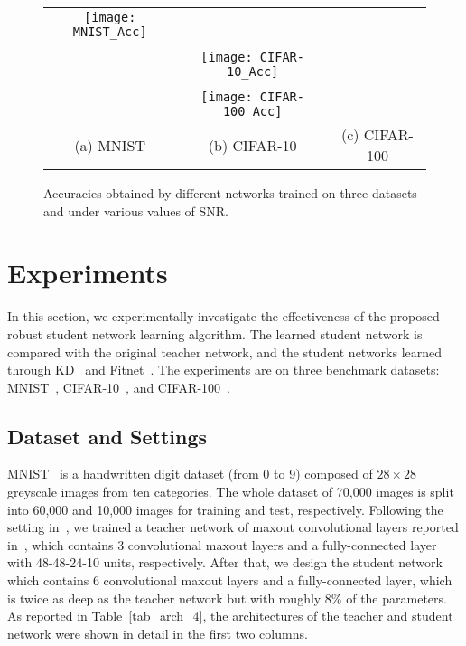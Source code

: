 \documentclass[journal]{IEEEtran}
\newcommand{\Tref}[1]{Table~\ref{#1}}
\begin{document}
\begin{figure*}
\setlength{\abovecaptionskip}{0.2cm}
\setlength{\belowcaptionskip}{0.2cm}
\centering
\begin{tabular}{ccc}
\centering
\texttt{[image: MNIST\_Acc]}\\\\& \texttt{[image: CIFAR-10\_Acc]}\\\\ & \texttt{[image: CIFAR-100\_Acc]} \\
(a) MNIST & (b) CIFAR-10 & (c) CIFAR-100 \\
\end{tabular}
\caption{Accuracies obtained by different networks trained on three datasets and under various values of SNR.}
\label{fig2}
\end{figure*}



\section{Experiments}
In this section, we experimentally investigate the effectiveness of the proposed robust student network learning algorithm. The learned student network is compared with the original teacher network, and the student networks learned through KD~\cite{hinton2015distilling} and Fitnet~\cite{romero2014fitnets}. The experiments are on three benchmark datasets: MNIST~\cite{lecun1998gradient}, CIFAR-10~\cite{krizhevsky2009learning}, and CIFAR-100~\cite{krizhevsky2009learning}.

\subsection{Dataset and Settings}
MNIST~\cite{lecun1998gradient} is a handwritten digit dataset (from 0 to 9) composed of $28\times 28$ greyscale images from ten categories. The whole dataset of 70,000 images is split into 60,000 and 10,000 images for training and test, respectively. Following the setting in~\cite{romero2014fitnets}, we trained a teacher network of maxout convolutional layers reported in~\cite{goodfellow2013maxout}, which contains 3 convolutional maxout layers and a fully-connected layer with 48-48-24-10 units, respectively. After that, we design the student network which contains 6 convolutional maxout layers and a fully-connected layer, which is twice as deep as the teacher network but with roughly 8\% of the parameters. As reported in \Tref{tab_arch_4}, the architectures of the teacher and student network were shown in detail in the first two columns.
\end{document}
